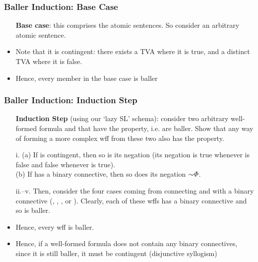 \begin{frame}
\frametitle{Baller Induction: Base Case}

\begin{itemize}[<+->]

\item[] \textbf{Base case}: this comprises the atomic sentences. So consider an arbitrary atomic sentence. 

\item Note that it is contingent: there exists a TVA where it is true, and a distinct TVA where it is false. 

\item Hence, every member in the base case is baller



\end{itemize}
\end{frame}

\begin{frame}
\frametitle{Baller Induction: Induction Step}

\begin{itemize}[<+->]

\item[] \textbf{Induction Step} (using our `lazy SL' schema): consider two arbitrary well-formed formula \metaA{} and \metaB{} that have the property, i.e. are baller. Show that any way of forming a more complex wff from these two also has the property. 

\bi

\item[i.] (a) If \metaA{} is contingent, then so is its negation (its negation is true whenever \metaA{} is false and false whenever \metaA{} is true). \\ (b) If \metaA{} has a binary connective, then so does its negation $\enot \metaA{}$.

\item[ii.--v.] Then, consider the four cases coming from connecting \metaA{} and \metaB{} with a binary connective (\eand, \eor, \eif, or \eiff). Clearly, each of these wffs has a binary connective and so is baller. 

\item Hence, every wff is baller. 
\ei

\item Hence, if a well-formed formula does not contain any binary connectives, since it is still baller, it must be contingent (disjunctive syllogism)

\end{itemize}
\end{frame}

